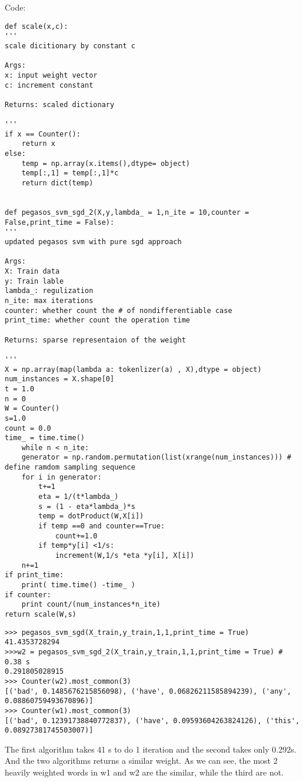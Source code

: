 \documentclass{article}
\newenvironment{problem}[2][$\bullet$]{\begin{trivlist}\large
		\item[\hskip \labelsep {\bfseries #1}\hskip \labelsep {\bfseries #2.}]}  {\end{trivlist}}
\begin{document}
Code:\\
\begin{verbatim}
def scale(x,c):
'''
scale dicitionary by constant c

Args:
x: input weight vector
c: increment constant 

Returns: scaled dictionary

'''
if x == Counter():
	return x
else:
	temp = np.array(x.items(),dtype= object)
	temp[:,1] = temp[:,1]*c
	return dict(temp)


def pegasos_svm_sgd_2(X,y,lambda_ = 1,n_ite = 10,counter = False,print_time = False):
'''
updated pegasos svm with pure sgd approach

Args:
X: Train data
y: Train lable
lambda_: regulization
n_ite: max iterations
counter: whether count the # of nondifferentiable case
print_time: whether count the operation time

Returns: sparse representaion of the weight

'''
X = np.array(map(lambda a: tokenlizer(a) , X),dtype = object)
num_instances = X.shape[0]
t = 1.0
n = 0
W = Counter()
s=1.0
count = 0.0
time_ = time.time()
	while n < n_ite:
	generator = np.random.permutation(list(xrange(num_instances))) # define ramdom sampling sequence
	for i in generator:
		t+=1
		eta = 1/(t*lambda_)
		s = (1 - eta*lambda_)*s
		temp = dotProduct(W,X[i])
		if temp ==0 and counter==True:
			count+=1.0
		if temp*y[i] <1/s:
			increment(W,1/s *eta *y[i], X[i])
	n+=1
if print_time:
	print( time.time() -time_ )
if counter:
	print count/(num_instances*n_ite)
return scale(W,s)
\end{verbatim}


\begin{problem}{3.4}
\end{problem}

\begin{verbatim}
>>> pegasos_svm_sgd(X_train,y_train,1,1,print_time = True)  
41.4353728294
>>>w2 = pegasos_svm_sgd_2(X_train,y_train,1,1,print_time = True) # 0.38 s
0.291805028915
>>> Counter(w2).most_common(3)
[('bad', 0.1485676215856098), ('have', 0.06826211585894239), ('any', 0.08860759493670896)]
>>> Counter(w1).most_common(3)
[('bad', 0.12391738840772837), ('have', 0.09593604263824126), ('this', 0.08927381745503007)]

\end{verbatim}

The first algorithm takes 41 s to do 1 iteration and the second takes only 0.292s. And the two algorithms returns a similar weight. As we can see, the most 2 heavily weighted words in w1 and w2 are the similar, while the third are not.\\
\end{document}
